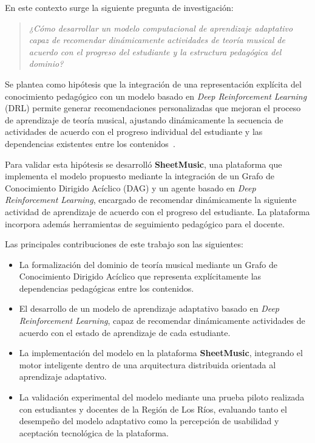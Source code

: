 \documentclass[conference]{IEEEtran}
\begin{document}
En este contexto surge la siguiente pregunta de investigación:

\begin{quote}
\textit{¿Cómo desarrollar un modelo computacional de aprendizaje adaptativo capaz de recomendar dinámicamente actividades de teoría musical de acuerdo con el progreso del estudiante y la estructura pedagógica del dominio?}
\end{quote}

Se plantea como hipótesis que la integración de una representación explícita del conocimiento pedagógico con un modelo basado en \textit{Deep Reinforcement Learning} (DRL) permite generar recomendaciones personalizadas que mejoran el proceso de aprendizaje de teoría musical, ajustando dinámicamente la secuencia de actividades de acuerdo con el progreso individual del estudiante y las dependencias existentes entre los contenidos~\cite{sutton2018reinforcement,mnih2015dqn}.

Para validar esta hipótesis se desarrolló \textbf{SheetMusic}, una plataforma que implementa el modelo propuesto mediante la integración de un Grafo de Conocimiento Dirigido Acíclico (DAG) y un agente basado en \textit{Deep Reinforcement Learning}, encargado de recomendar dinámicamente la siguiente actividad de aprendizaje de acuerdo con el progreso del estudiante. La plataforma incorpora además herramientas de seguimiento pedagógico para el docente.

Las principales contribuciones de este trabajo son las siguientes:

\begin{itemize}
\item La formalización del dominio de teoría musical mediante un Grafo de Conocimiento Dirigido Acíclico que representa explícitamente las dependencias pedagógicas entre los contenidos.

\item El desarrollo de un modelo de aprendizaje adaptativo basado en \textit{Deep Reinforcement Learning}, capaz de recomendar dinámicamente actividades de acuerdo con el estado de aprendizaje de cada estudiante.

\item La implementación del modelo en la plataforma \textbf{SheetMusic}, integrando el motor inteligente dentro de una arquitectura distribuida orientada al aprendizaje adaptativo.

\item La validación experimental del modelo mediante una prueba piloto realizada con estudiantes y docentes de la Región de Los Ríos, evaluando tanto el desempeño del modelo adaptativo como la percepción de usabilidad y aceptación tecnológica de la plataforma.
\end{itemize}
\end{document}
